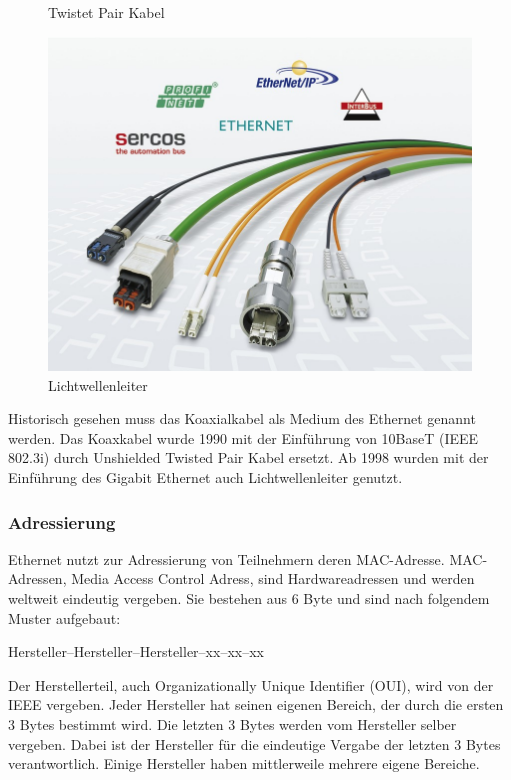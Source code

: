\documentclass[12pt, a4paper, ngerman]{article}
\begin{document}
\begin{figure}[H]
\begin{minipage}[hbt]{.28\linewidth}
	\caption{Twistet Pair Kabel \cite{tw_kabel}}
	\label{twkabel}
\end{minipage}
\hfill
\begin{minipage}[hbt]{.28\linewidth}
	\centering
	\includegraphics[width=0.9\linewidth]{Grafiken/lwl_leiter.jpg}
	\caption{Lichtwellenleiter \cite{lwl_leiter}}
	\label{lwlleiter}
\end{minipage}
\end{figure}
 
Historisch gesehen muss das Koaxialkabel als Medium des Ethernet genannt werden. Das Koaxkabel wurde 1990 mit der Einführung von 10BaseT (IEEE 802.3i) durch Unshielded Twisted Pair Kabel ersetzt. Ab 1998 wurden mit der Einführung des Gigabit Ethernet auch Lichtwellenleiter genutzt. 

\subsubsection{Adressierung \label{ethernet_adresse}}
 Ethernet nutzt zur Adressierung von Teilnehmern deren MAC-Adresse. MAC-Adressen, Media Access Control Adress, sind Hardwareadressen und werden weltweit eindeutig vergeben. Sie bestehen aus 6 Byte und sind nach folgendem Muster aufgebaut: 
 
 Hersteller--Hersteller--Hersteller--xx--xx--xx 

Der Herstellerteil, auch Organizationally  Unique Identifier (OUI), wird von der IEEE vergeben. Jeder Hersteller hat seinen eigenen Bereich, der durch die ersten 3 Bytes bestimmt wird. Die letzten 3 Bytes werden vom Hersteller selber vergeben. Dabei ist der Hersteller für die eindeutige Vergabe der letzten 3 Bytes verantwortlich. Einige Hersteller haben mittlerweile mehrere eigene Bereiche.
\end{document}
